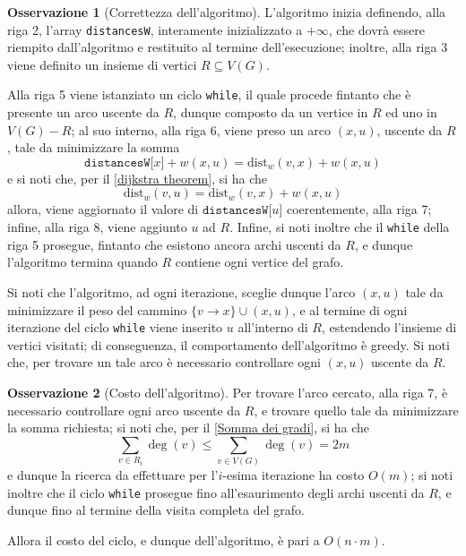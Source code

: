 \documentclass[14pt]{extreport}
\theoremstyle{definition}
\theoremstyle{definition}
\newtheorem{remark}{Osservazione}[subsection]
\begin{document}
\begin{remark}[Correttezza dell'algoritmo]
    L'algoritmo inizia definendo, alla riga 2, l'array \texttt{distancesW}, interamente inizializzato a $+ \infty$, che dovrà essere riempito dall'algoritmo e restituito al termine dell'esecuzione; inoltre, alla riga 3 viene definito un insieme di vertici $R \subseteq V(G)$.

    Alla riga 5 viene istanziato un ciclo \texttt{while}, il quale procede fintanto che è presente un arco uscente da $R$, dunque composto da un vertice in $R$ ed uno in $V(G) - R$; al suo interno, alla riga 6, viene preso un arco $(x, u)$, uscente da $R$, tale da minimizzare la somma $$\texttt{distancesW[}x\texttt{]} + w(x, u) = \mathrm{dist}_w(v, x) + w(x, u)$$ e si noti che, per il \cref{dijkstra theorem}, si ha che $$\mathrm{dist}_w(v, u) = \mathrm{dist}_w(v, x) + w(x, u)$$ allora, viene aggiornato il valore di $\texttt{distancesW[}u\texttt{]}$ coerentemente, alla riga 7; infine, alla riga 8, viene aggiunto $u$ ad $R$. Infine, si noti inoltre che il \texttt{while} della riga 5 prosegue, fintanto che esistono ancora archi uscenti da $R$, e dunque l'algoritmo termina quando $R$ contiene ogni vertice del grafo.

    Si noti che l'algoritmo, ad ogni iterazione, sceglie dunque l'arco $(x, u)$ tale da minimizzare il peso del cammino $\{v \rightarrow x\} \cup (x, u)$, e al termine di ogni iterazione del ciclo \texttt{while} viene inserito $u$ all'interno di $R$, estendendo l'insieme di vertici visitati; di conseguenza, il comportamento dell'algoritmo è greedy. Si noti che, per trovare un tale arco è necessario controllare ogni $(x, u)$ uscente da $R$.
\end{remark}

\begin{remark}[Costo dell'algoritmo]
    Per trovare l'arco cercato, alla riga 7, è necessario controllare ogni arco uscente da $R$, e trovare quello tale da minimizzare la somma richiesta; si noti che, per il \cref{Somma dei gradi}, si ha che $$\displaystyle \sum_{v \in R_i}{\deg(v)} \le \sum_{v \in V(G)}{\deg(v)} = 2m$$ e dunque la ricerca da effettuare per l'$i$-esima iterazione ha costo $O(m)$; si noti inoltre che il ciclo \texttt{while} prosegue fino all'esaurimento degli archi uscenti da $R$, e dunque fino al termine della visita completa del grafo.

    Allora il costo del ciclo, e dunque dell'algoritmo, è pari a $O(n \cdot m)$.
\end{remark}
\end{document}
